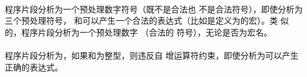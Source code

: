 \paragraph{} %
\begin{example} %
  程序片段分析为一个预处理数字符号（既不是合法也
  不是合法符号），即使分析为三个预处理符号，
  \tm{+}和可以产生一个合法的表达式（比如是定义为的宏）。类
  似的，程序片段分析为一个预处理数字 （合法的
  符号），无论是否为宏名。
\end{example}

\paragraph{} %
\begin{example} %
  程序片段分析为，如果和为整型，则违反自
  增运算符约束，即使分析为可以产生正确的表达式。
\end{example}
